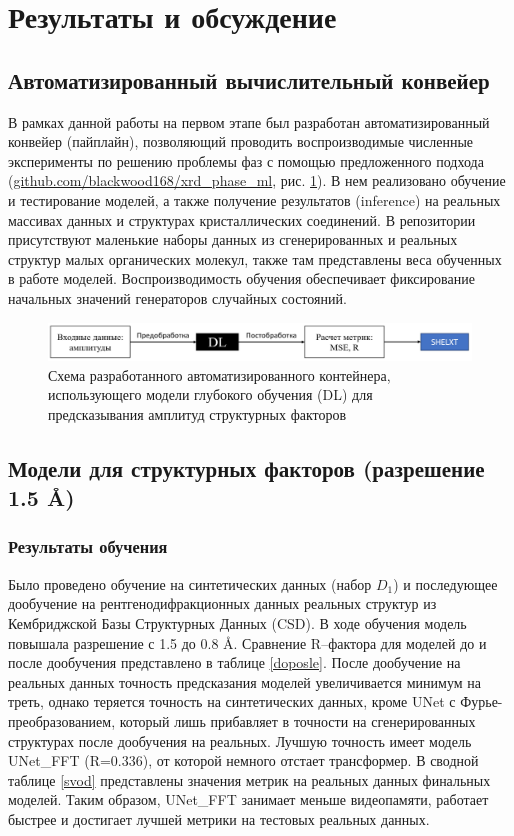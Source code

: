 \section{Результаты и обсуждение}

\subsection{Автоматизированный вычислительный конвейер}

В рамках данной работы на первом этапе был разработан автоматизированный конвейер (пайплайн), позволяющий проводить воспроизводимые численные эксперименты по решению проблемы фаз с помощью предложенного подхода (\url{github.com/blackwood168/xrd_phase_ml}, рис. \ref{pipeline}). В нем реализовано обучение и тестирование моделей, а также получение результатов (inference) на реальных массивах данных и структурах кристаллических соединений. В репозитории присутствуют маленькие наборы данных из сгенерированных и реальных структур малых органических молекул, также там представлены веса обученных в работе моделей. Воспроизводимость обучения обеспечивает фиксирование начальных значений генераторов случайных состояний.

\begin{figure}[H]
    \centering
    \includegraphics[width=1\textwidth]{figures/pipeline.png}
    \caption{Схема разработанного автоматизированного контейнера, использующего модели глубокого обучения (DL) для предсказывания амплитуд структурных факторов}
    \label{pipeline}
\end{figure}


\subsection{Модели для структурных факторов (разрешение 1.5 \AA)}

\subsubsection{Результаты обучения}

Было проведено обучение на синтетических данных (набор $D_1$) и последующее дообучение на рентгенодифракционных данных реальных структур из Кембриджской Базы Структурных Данных (CSD). В ходе обучения модель повышала разрешение с 1.5 до 0.8 \AA. Сравнение R--фактора для моделей до и после дообучения представлено в таблице \ref{doposle}. После дообучение на реальных данных точность предсказания моделей увеличивается минимум на треть, однако теряется точность на синтетических данных, кроме UNet с Фурье-преобразованием, который лишь прибавляет в точности на сгенерированных структурах после дообучения на реальных. Лучшую точность имеет модель UNet\_FFT (R=0.336), от которой немного отстает трансформер. В сводной таблице \ref{svod} представлены значения метрик на реальных данных финальных моделей. Таким образом, UNet\_FFT занимает меньше видеопамяти, работает быстрее и достигает лучшей метрики на тестовых реальных данных.

